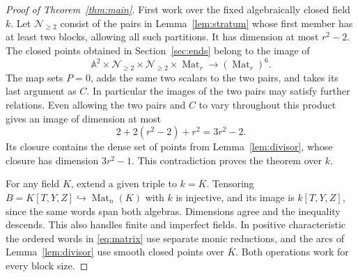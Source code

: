 \documentclass[11pt,reqno]{amsart}
\theoremstyle{definition}
\newcommand{\Mat}{\operatorname{Mat}}
\newcommand{\A}{\mathbb A}
\begin{document}
\begin{proof}[Proof of Theorem~\ref{thm:main}]
First work over the fixed algebraically closed field \(k\). Let
\(\mathcal N_{\geq2}\) consist of the pairs in Lemma~\ref{lem:stratum}
whose first member has at least two blocks, allowing all such partitions.
It has dimension at most \(r^2-2\). The closed points obtained in
Section~\ref{sec:ends} belong to the image of
\[
 \A^2\times\mathcal N_{\geq2}\times\mathcal N_{\geq2}\times\Mat_r
             \longrightarrow (\Mat_r)^6 .
\]
The map sets \(P=0\), adds the same two scalars to the two pairs, and
takes its last argument as \(C\). In particular the images of the two
pairs may satisfy further relations. Even allowing the two pairs and
\(C\) to vary throughout this product gives an image of dimension at most
\[
                         2+2(r^2-2)+r^2=3r^2-2 .
\]
Its closure contains the dense set of points from
Lemma~\ref{lem:divisor}, whose closure has dimension \(3r^2-1\). This
contradiction proves the theorem over \(k\).

For any field \(K\), extend a given triple to \(k=\overline K\).
Tensoring \(B=K[T,Y,Z]\hookrightarrow\Mat_n(K)\) with \(k\) is injective,
and its image is \(k[T,Y,Z]\), since the same words span both algebras.
Dimensions agree and the inequality descends. This also handles finite
and imperfect fields. In positive characteristic the ordered words in
\eqref{eq:matrix} use separate monic reductions, and the arcs of
Lemma~\ref{lem:divisor} use smooth closed points over \(\overline K\).
Both operations work for every block size.
\end{proof}
\end{document}
